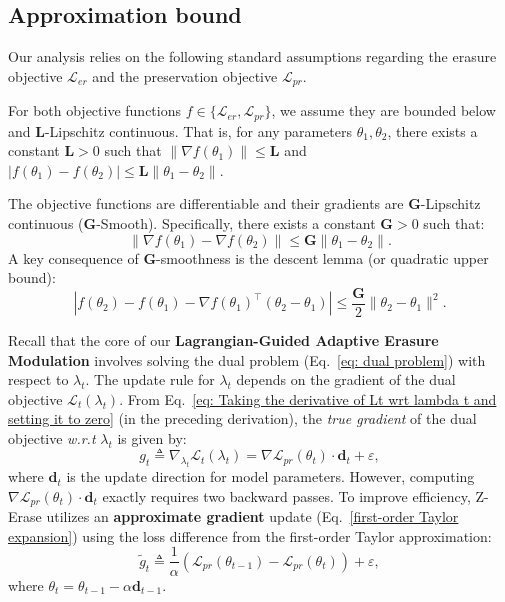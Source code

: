 \subsection{Approximation bound}

Our analysis relies on the following standard assumptions regarding the erasure objective $\mathcal{L}_{er}$ and the preservation objective $\mathcal{L}_{pr}$.

\begin{assumption}
\label{assum:lipschitz}
For both objective functions $f \in \{\mathcal{L}_{er}, \mathcal{L}_{pr}\}$, we assume they are bounded below and $\mathbf{L}$-Lipschitz continuous. That is, for any parameters $\theta_1, \theta_2$, there exists a constant $\mathbf{L} > 0$ such that $\|\nabla f(\theta_1)\| \le \mathbf{L}$ and $|f(\theta_1) - f(\theta_2)| \le \mathbf{L} \|\theta_1 - \theta_2\|$.
\end{assumption}

\begin{assumption}
\label{assum:smoothness}
The objective functions are differentiable and their gradients are $\mathbf{G}$-Lipschitz continuous ($\mathbf{G}$-Smooth). Specifically, there exists a constant $\mathbf{G} > 0$ such that:
\begin{equation}
    \|\nabla f(\theta_1) - \nabla f(\theta_2)\| \le \mathbf{G} \|\theta_1 - \theta_2\|.
\end{equation}
A key consequence of $\mathbf{G}$-smoothness is the descent lemma (or quadratic upper bound):
\begin{equation}
    |f(\theta_2) - f(\theta_1) - \nabla f(\theta_1)^\top (\theta_2 - \theta_1)| \le \frac{\mathbf{G}}{2} \|\theta_2 - \theta_1\|^2.
\end{equation}
\end{assumption}

Recall that the core of our \textbf{Lagrangian-Guided Adaptive Erasure Modulation} involves solving the dual problem (Eq.~\ref{eq: dual problem}) with respect to $\lambda_t$. The update rule for $\lambda_t$ depends on the gradient of the dual objective $\mathcal{L}_t(\lambda_t)$.
From Eq.~\ref{eq: Taking the derivative of Lt wrt lambda t and setting it to zero} (in the preceding derivation), the \emph{true gradient} of the dual objective \textit{w.r.t} $\lambda_t$ is given by:
\begin{equation}
    g_t \triangleq \nabla_{\lambda_t} \mathcal{L}_t(\lambda_t) = \nabla \mathcal{L}_{pr}(\theta_t) \cdot \mathbf{d}_t + \varepsilon,
\end{equation}
where $\mathbf{d}_t$ is the update direction for model parameters.
However, computing $\nabla \mathcal{L}_{pr}(\theta_t) \cdot \mathbf{d}_t$ exactly requires two backward passes. To improve efficiency, Z-Erase utilizes an \textbf{approximate gradient} update (Eq.~\ref{first-order Taylor expansion}) using the loss difference from the first-order Taylor approximation:
\begin{equation}
    \tilde{g}_t \triangleq \frac{1}{\alpha} (\mathcal{L}_{pr}(\theta_{t-1}) - \mathcal{L}_{pr}(\theta_{t})) + \varepsilon,
\end{equation}
where $\theta_{t} = \theta_{t-1} - \alpha \mathbf{d}_{t-1}$.

